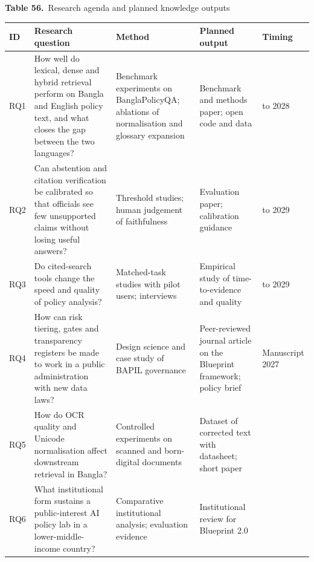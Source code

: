 \documentclass[border=10pt]{standalone}
\begin{document}
\begin{minipage}{17cm}
{\large\bfseries Table 56.}\ {\large Research agenda and planned knowledge outputs}\par\vspace{7pt}
\small
{}
\begin{tabularx}{\linewidth}{@{}>{\hsize=0.372\hsize\raggedright\arraybackslash}X>{\hsize=1.596\hsize\raggedright\arraybackslash}X>{\hsize=1.170\hsize\raggedright\arraybackslash}X>{\hsize=1.277\hsize\raggedright\arraybackslash}X>{\hsize=0.585\hsize\raggedright\arraybackslash}X@{}}
\arrayrulecolor{bapilrule}\toprule
\rowcolor{white}\textbf{ID} & \textbf{Research question} & \textbf{Method} & \textbf{Planned output} & \textbf{Timing} \\
\midrule
RQ1 & How well do lexical, dense and hybrid retrieval perform on Bangla and English policy text, and what closes the gap between the two languages? & Benchmark experiments on BanglaPolicyQA; ablations of normalisation and glossary expansion & Benchmark and methods paper; open code and data & 2027 to 2028 \\
RQ2 & Can abstention and citation verification be calibrated so that officials see few unsupported claims without losing useful answers? & Threshold studies; human judgement of faithfulness & Evaluation paper; calibration guidance & 2027 to 2029 \\
RQ3 & Do cited-search tools change the speed and quality of policy analysis? & Matched-task studies with pilot users; interviews & Empirical study of time-to-evidence and quality & 2028 to 2029 \\
RQ4 & How can risk tiering, gates and transparency registers be made to work in a public administration with new data laws? & Design science and case study of BAPIL governance & Peer-reviewed journal article on the Blueprint framework; policy brief & Manuscript 2027 \\
RQ5 & How do OCR quality and Unicode normalisation affect downstream retrieval in Bangla? & Controlled experiments on scanned and born-digital documents & Dataset of corrected text with datasheet; short paper & 2028 \\
RQ6 & What institutional form sustains a public-interest AI policy lab in a lower-middle-income country? & Comparative institutional analysis; evaluation evidence & Institutional review for Blueprint 2.0 & 2029 \\
\bottomrule
\end{tabularx}
\par\vspace{5pt}{\footnotesize\itshape Outputs are published open access with DOIs. Journal choice follows scope, open-access options and peer-review quality; no outcome of peer review is assumed.}
\par{}
\end{minipage}
\end{document}
